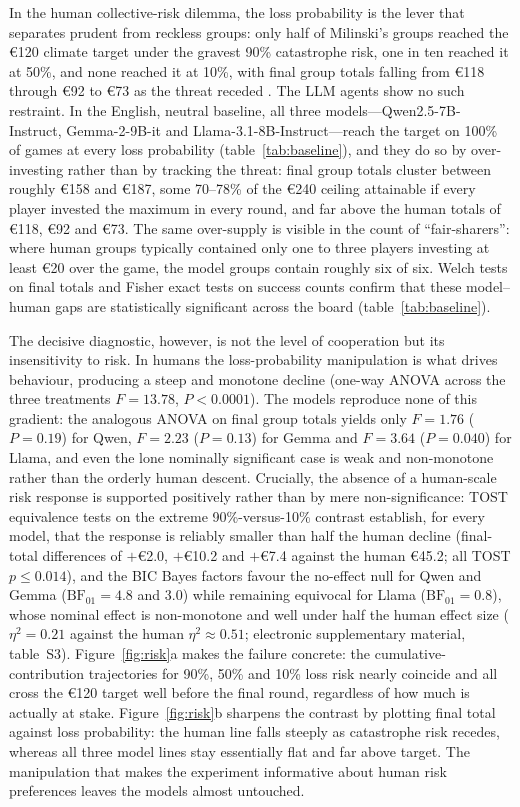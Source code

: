 In the human collective-risk dilemma, the loss probability is the lever that separates prudent from reckless groups: only half of Milinski's groups reached the €120 climate target under the gravest 90\% catastrophe risk, one in ten reached it at 50\%, and none reached it at 10\%, with final group totals falling from €118 through €92 to €73 as the threat receded \cite{milinski2008climate}. The LLM agents show no such restraint. In the English, neutral baseline, all three models---Qwen2.5-7B-Instruct, Gemma-2-9B-it and Llama-3.1-8B-Instruct---reach the target on 100\% of games at every loss probability (table~\ref{tab:baseline}), and they do so by over-investing rather than by tracking the threat: final group totals cluster between roughly €158 and €187, some 70--78\% of the €240 ceiling attainable if every player invested the maximum in every round, and far above the human totals of €118, €92 and €73. The same over-supply is visible in the count of ``fair-sharers'': where human groups typically contained only one to three players investing at least €20 over the game, the model groups contain roughly six of six. Welch tests on final totals and Fisher exact tests on success counts confirm that these model--human gaps are statistically significant across the board (table~\ref{tab:baseline}).

The decisive diagnostic, however, is not the level of cooperation but its insensitivity to risk. In humans the loss-probability manipulation is what drives behaviour, producing a steep and monotone decline (one-way ANOVA across the three treatments $F=13.78$, $P<0.0001$). The models reproduce none of this gradient: the analogous ANOVA on final group totals yields only $F=1.76$ ($P=0.19$) for Qwen, $F=2.23$ ($P=0.13$) for Gemma and $F=3.64$ ($P=0.040$) for Llama, and even the lone nominally significant case is weak and non-monotone rather than the orderly human descent. Crucially, the absence of a human-scale risk response is supported positively rather than by mere non-significance: TOST equivalence tests on the extreme 90\%-versus-10\% contrast establish, for every model, that the response is reliably smaller than half the human decline (final-total differences of $+$€2.0, $+$€10.2 and $+$€7.4 against the human €45.2; all TOST $p \leq 0.014$), and the BIC Bayes factors favour the no-effect null for Qwen and Gemma ($\mathrm{BF}_{01}=4.8$ and $3.0$) while remaining equivocal for Llama ($\mathrm{BF}_{01}=0.8$), whose nominal effect is non-monotone and well under half the human effect size ($\eta^2=0.21$ against the human $\eta^2\approx0.51$; electronic supplementary material, table~S3). Figure~\ref{fig:risk}a makes the failure concrete: the cumulative-contribution trajectories for 90\%, 50\% and 10\% loss risk nearly coincide and all cross the €120 target well before the final round, regardless of how much is actually at stake. Figure~\ref{fig:risk}b sharpens the contrast by plotting final total against loss probability: the human line falls steeply as catastrophe risk recedes, whereas all three model lines stay essentially flat and far above target. The manipulation that makes the experiment informative about human risk preferences leaves the models almost untouched.

